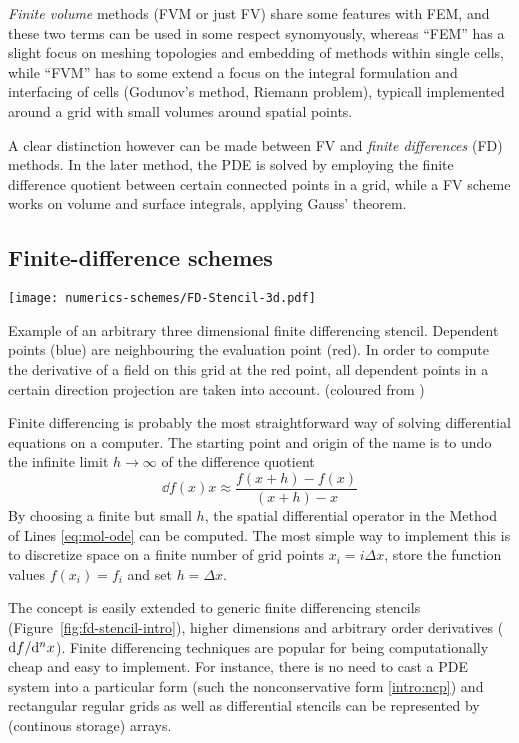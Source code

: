 \emph{Finite volume} methods (FVM or just FV) share some features with FEM,
and these two terms can be used in some respect synomyously, whereas ``FEM''
has a slight focus on meshing topologies and embedding of methods within
single cells, while ``FVM'' has to some extend a focus on the integral
formulation and interfacing of cells (Godunov's method, Riemann problem),
typicall implemented around a grid with small volumes around spatial points.

A clear distinction however can be made between FV and \emph{finite 
differences} (FD) methods. In the later method, the PDE is solved by employing
the finite difference quotient between certain connected points in a grid,
while a FV scheme works on volume and surface integrals, applying Gauss'
theorem.

\subsection{Finite-difference schemes}
\begin{marginfigure}[-4cm]
\texttt{[image: numerics-schemes/FD-Stencil-3d.pdf]}
\caption[
  FD stencil motivational cartoon,  
]{
  Example of an arbitrary three dimensional finite differencing stencil.
  Dependent points (blue) are neighbouring the evaluation point (red).
  In order to compute the derivative of a field on this grid at the red point,
  all dependent points in a certain direction projection are taken into account.
  (coloured from \cite{FDStenicl3d})
}\label{fig:fd-stencil-intro}
\end{marginfigure}

Finite differencing is probably the most straightforward way of solving
differential equations on a computer. The starting point and origin of
the name is to undo the infinite limit $h\to\infty$ of the difference quotient
\begin{equation}
\dd{f(x)}{x} \approx \frac{f(x+h) - f(x)}{(x+h) - x}
\end{equation}
By choosing a finite but small $h$, the spatial differential operator in the
Method of Lines \eqref{eq:mol-ode} can be computed. The most simple way to
implement this is to discretize space on a finite number of grid points
$x_i = i\Delta x$, store the
function values $f(x_i)=f_i$ and set $h=\Delta x$.

The concept is easily extended to generic finite differencing stencils
(Figure~\ref{fig:fd-stencil-intro}),
higher dimensions and arbitrary order derivatives ($\mathrm{d} f/{\mathrm{d}^n x}$).
Finite differencing techniques are popular for being computationally cheap
and easy to implement. For instance, there is no need to cast a PDE system
into a particular form (such the nonconservative form \eqref{intro:ncp}) and
rectangular regular grids as well as differential stencils
can be represented by (continous storage) arrays.

